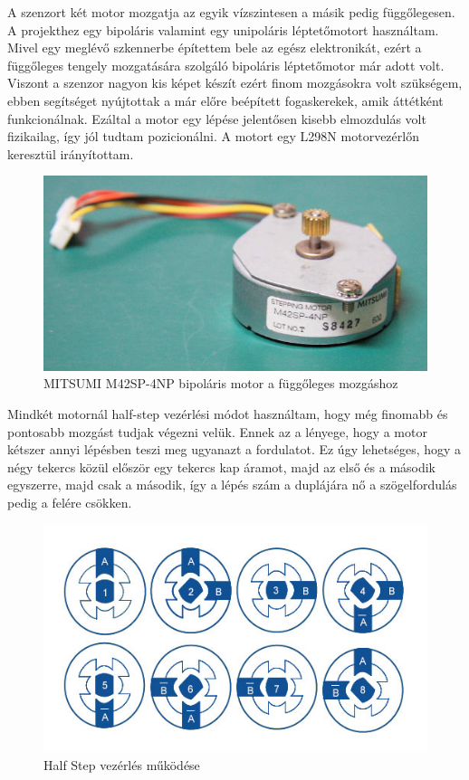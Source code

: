 \documentclass[]{thesis-ekf}
\theoremstyle{definition}
\theoremstyle{remark}
\begin{document}
A szenzort két motor mozgatja az egyik vízszintesen a másik pedig függőlegesen. A projekthez egy bipoláris valamint egy unipoláris léptetőmotort\cite{motorvezerlok} használtam. Mivel egy meglévő szkennerbe építettem bele az egész elektronikát, ezért a függőleges tengely mozgatására szolgáló bipoláris léptetőmotor már adott volt. Viszont a szenzor nagyon kis képet készít ezért finom mozgásokra volt szükségem, ebben segítséget nyújtottak a már előre beépített fogaskerekek, amik áttétként funkcionálnak. Ezáltal a motor egy lépése jelentősen kisebb elmozdulás volt fizikailag, így jól tudtam pozicionálni. A motort egy L298N\cite{l298n} motorvezérlőn keresztül irányítottam.
\begin{figure}[th!]
	\centering
	\includegraphics[width=0.4\linewidth]{MITSUMI-Stepping-Motor-M42SP-4NP}
	\caption[Mitsumi]{\footnotesize {MITSUMI M42SP-4NP bipoláris motor a függőleges mozgáshoz}}
	\label{fig:mitsumi-stepping-motor-m42sp-4np}
\end{figure}

Mindkét motornál half-step vezérlési módot használtam, hogy még finomabb és pontosabb mozgást tudjak végezni velük. Ennek az a lényege, hogy a motor kétszer annyi lépésben teszi meg ugyanazt a fordulatot. Ez úgy lehetséges, hogy a négy tekercs közül először egy tekercs kap áramot, majd az első és a második egyszerre, majd csak a második, így a lépés szám a duplájára nő a szögelfordulás pedig a felére csökken.

\begin{figure}[th!]
	\centering
	\includegraphics[width=0.5\linewidth]{stepper-motors-half-step}
	\caption[Half Step vezérlés]{Half Step vezérlés működése}
	\label{fig:stepper-motors-half-step}
\end{figure}
\end{document}
